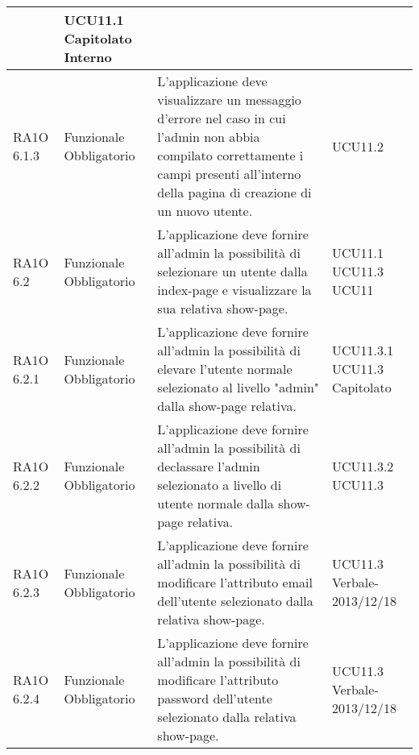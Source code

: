 \begin{center}
\begin{longtable}{ | l | p{2cm} | p{5cm} | p{1.7cm} |}
 &  UCU11.1 \newline  Capitolato \newline  Interno \newline  \\ \hline      
        RA1O 6.1.3  & Funzionale \newline  Obbligatorio  & L'applicazione deve visualizzare un messaggio d'errore nel caso in cui l'admin non abbia compilato correttamente i campi presenti all'interno della pagina di creazione di un nuovo utente.
 &  UCU11.2 \newline  \\ \hline      
        RA1O 6.2  & Funzionale \newline  Obbligatorio  & L'applicazione deve fornire all'admin la possibilità di selezionare un utente dalla index-page e visualizzare la sua relativa show-page.
 &  UCU11.1 \newline  UCU11.3 \newline  UCU11 \newline  \\ \hline      
        RA1O 6.2.1 & Funzionale \newline  Obbligatorio  & L'applicazione deve fornire all'admin la possibilità di elevare l'utente normale selezionato al livello "admin" dalla show-page relativa. &  UCU11.3.1 \newline  UCU11.3 \newline  Capitolato \newline  \\ \hline      
        RA1O 6.2.2 & Funzionale \newline  Obbligatorio  & L'applicazione deve fornire all'admin la possibilità di declassare l'admin selezionato a livello di utente normale dalla show-page relativa. &  UCU11.3.2 \newline  UCU11.3 \newline  \\ \hline      
        RA1O 6.2.3 & Funzionale \newline  Obbligatorio  & L'applicazione deve fornire all'admin la possibilità di modificare l'attributo email dell'utente selezionato dalla relativa show-page. &  UCU11.3 \newline  Verbale-2013/12/18 \newline  \\ \hline      
        RA1O 6.2.4 & Funzionale \newline  Obbligatorio  & L'applicazione deve fornire all'admin la possibilità di modificare l'attributo password dell'utente selezionato dalla relativa show-page. &  UCU11.3 \newline  Verbale-2013/12/18 \newline  \\ \hline      

\end{longtable}
\end{center}
